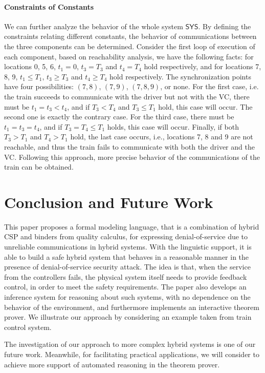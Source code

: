 \documentclass{llncs}
\begin{document}
\paragraph{\textbf{Constraints of Constants}}

We can further analyze the behavior of the whole system $\textsf{SYS}$. By defining the constraints relating
 different constants, the behavior of communications between
the three components can be determined.
Consider the first loop of execution of each component, based on reachability analysis, we have the following facts:
for locations 0, 5, 6,  $t_1=0$, $t_3 = T_3$ and $t_4 = T_4$ hold respectively, and
for locations 7, 8, 9, $t_1 \leq T_1$, $t_3 \geq T_3$ and $t_4 \geq T_4$ hold respectively.
The synchronization points have four possibilities: $(7, 8)$,  $(7, 9)$,  $(7, 8, 9)$, or none. For the first case,
i.e. the train succeeds to communicate with the driver but not with the VC,
there must be $t_1 = t_3 < t_4$, and if $T_3 < T_4$ and $T_3 \leq T_1$ hold, this case will occur.
The second one is exactly the contrary case.
For the third case, there must be $t_1 = t_3 = t_4$, and if
$T_3 = T_4 \leq T_1$ holds, this case will occur. Finally, if both
$T_3 > T_1$ and $T_4 > T_1$ hold, the last case occurs, i.e., locations 7, 8 and 9 are not reachable, and thus
the train fails to communicate with both the driver and the VC.
Following this approach,  more precise behavior of the communications of the train
can be obtained.


\section{Conclusion and Future Work}
\label{sec:conclusion}


This paper proposes a formal modeling  language, that is a combination of hybrid CSP and binders from quality calculus,
 for expressing denial-of-service due to unreliable communications in hybrid systems.
With the linguistic support, it is able to build a safe hybrid system that behaves in a reasonable manner
in the presence of denial-of-service security attack. 
The idea is that, when the service from the controllers  fails, the physical
system itself needs to provide feedback control, in order to meet the safety requirements.
The paper also develops an inference system for reasoning about  such systems,
with no dependence on the behavior of the environment, and furthermore  implements an interactive theorem prover.
We illustrate our approach by considering an example taken from train control system.


The investigation of our approach to more
complex hybrid systems is one of our future work. Meanwhile, for facilitating practical applications, we will consider
to achieve more support of automated reasoning in the theorem prover.




\end{document}
